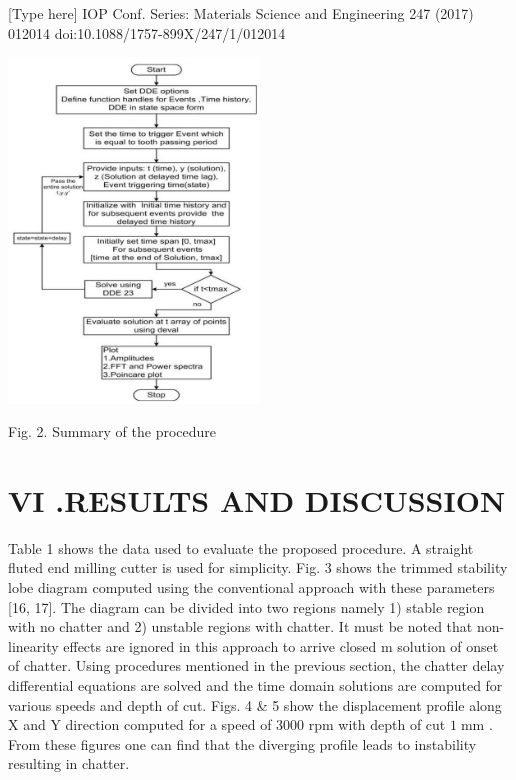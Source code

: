 \documentclass[10pt]{article}
\begin{document}
[Type here] IOP Conf. Series: Materials Science and Engineering 247 (2017) 012014 doi:10.1088/1757-899X/247/1/012014

\begin{center}
\includegraphics[max width=0.5\textwidth]{images/01948e67-2b92-7dd1-b16f-a9746c8d80be_7_518_284_614_844_0.jpg}
\end{center}
\hspace*{3em} 

Fig. 2. Summary of the procedure

\section*{VI .RESULTS AND DISCUSSION}

Table 1 shows the data used to evaluate the proposed procedure. A straight fluted end milling cutter is used for simplicity. Fig. 3 shows the trimmed stability lobe diagram computed using the conventional approach with these parameters [16, 17]. The diagram can be divided into two regions namely 1) stable region with no chatter and 2) unstable regions with chatter. It must be noted that non-linearity effects are ignored in this approach to arrive closed \(\mathrm{m}\) solution of onset of chatter. Using procedures mentioned in the previous section, the chatter delay differential equations are solved and the time domain solutions are computed for various speeds and depth of cut. Figs. 4 \& 5 show the displacement profile along X and Y direction computed for a speed of 3000 rpm with depth of cut \(1\mathrm{\;{mm}}\) . From these figures one can find that the diverging profile leads to instability resulting in chatter.
\end{document}
